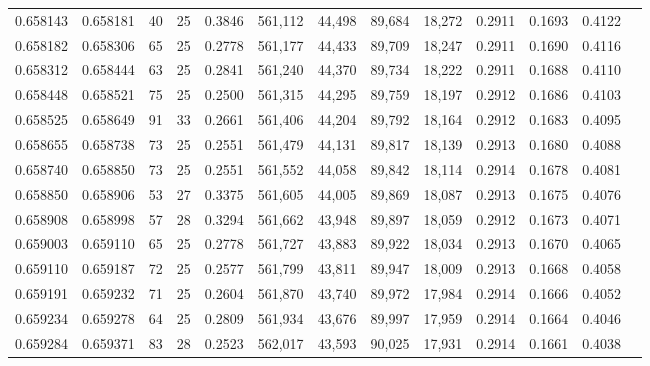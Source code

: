 \begin{tabular}{rrrrrrrrrrrrr}
0.658143 & 0.658181 &  40 &  25 &                                     0.3846 & 561,112 &  44,498 &  89,684 &  18,272 & 0.2911 & 0.1693 & 0.4122 \\
0.658182 & 0.658306 &  65 &  25 &                                     0.2778 & 561,177 &  44,433 &  89,709 &  18,247 & 0.2911 & 0.1690 & 0.4116 \\
0.658312 & 0.658444 &  63 &  25 &                                     0.2841 & 561,240 &  44,370 &  89,734 &  18,222 & 0.2911 & 0.1688 & 0.4110 \\
0.658448 & 0.658521 &  75 &  25 &                                     0.2500 & 561,315 &  44,295 &  89,759 &  18,197 & 0.2912 & 0.1686 & 0.4103 \\
0.658525 & 0.658649 &  91 &  33 &                                     0.2661 & 561,406 &  44,204 &  89,792 &  18,164 & 0.2912 & 0.1683 & 0.4095 \\
0.658655 & 0.658738 &  73 &  25 &                                     0.2551 & 561,479 &  44,131 &  89,817 &  18,139 & 0.2913 & 0.1680 & 0.4088 \\
0.658740 & 0.658850 &  73 &  25 &                                     0.2551 & 561,552 &  44,058 &  89,842 &  18,114 & 0.2914 & 0.1678 & 0.4081 \\
0.658850 & 0.658906 &  53 &  27 &                                     0.3375 & 561,605 &  44,005 &  89,869 &  18,087 & 0.2913 & 0.1675 & 0.4076 \\
0.658908 & 0.658998 &  57 &  28 &                                     0.3294 & 561,662 &  43,948 &  89,897 &  18,059 & 0.2912 & 0.1673 & 0.4071 \\
0.659003 & 0.659110 &  65 &  25 &                                     0.2778 & 561,727 &  43,883 &  89,922 &  18,034 & 0.2913 & 0.1670 & 0.4065 \\
0.659110 & 0.659187 &  72 &  25 &                                     0.2577 & 561,799 &  43,811 &  89,947 &  18,009 & 0.2913 & 0.1668 & 0.4058 \\
0.659191 & 0.659232 &  71 &  25 &                                     0.2604 & 561,870 &  43,740 &  89,972 &  17,984 & 0.2914 & 0.1666 & 0.4052 \\
0.659234 & 0.659278 &  64 &  25 &                                     0.2809 & 561,934 &  43,676 &  89,997 &  17,959 & 0.2914 & 0.1664 & 0.4046 \\
0.659284 & 0.659371 &  83 &  28 &                                     0.2523 & 562,017 &  43,593 &  90,025 &  17,931 & 0.2914 & 0.1661 & 0.4038 \\

\end{tabular}
